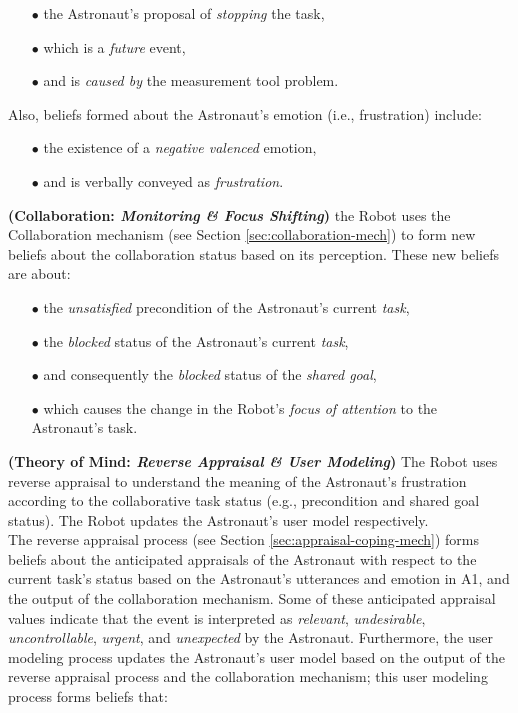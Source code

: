 \begin{itemize}
  \item[$\bullet$] the Astronaut's proposal of \textit{stopping} the task,
  \item[$\bullet$] which is a \textit{future} event,
  \item[$\bullet$] and is \textit{caused by} the measurement tool problem.
\end{itemize}

\noindent Also, beliefs formed about the Astronaut's emotion (i.e., frustration)
include:

\begin{itemize}
  \item[$\bullet$] the existence of a \textit{negative valenced} emotion,
  \item[$\bullet$] and is verbally conveyed as \textit{frustration}.\\
\end{itemize}

\noindent\textbf{(Collaboration: \textit{Monitoring \& Focus Shifting})}
the Robot uses the Collaboration mechanism (see Section
\ref{sec:collaboration-mech}) to form new beliefs about the collaboration status
based on its perception. These new beliefs are about:

\begin{itemize}
  \item[$\bullet$] the \textit{unsatisfied} precondition of the Astronaut's
  current \textit{task},
  \item[$\bullet$] the \textit{blocked} status of the Astronaut's current
  \textit{task},
  \item[$\bullet$] and consequently the \textit{blocked} status of the
  \textit{shared goal},
  \item[$\bullet$] which causes the change in the Robot's \textit{focus of
  attention} to the Astronaut's task.
\end{itemize}

\noindent \textbf{(Theory of Mind: \textit{Reverse Appraisal \& User
Modeling})} The Robot uses reverse appraisal to understand the meaning of the
Astronaut's frustration according to the collaborative task status (e.g.,
precondition and shared goal status). The Robot updates the Astronaut's user
model respectively.\\

The reverse appraisal process (see Section \ref{sec:appraisal-coping-mech})
forms beliefs about the anticipated appraisals of the Astronaut with respect to
the current task's status based on the Astronaut's utterances and emotion in A1,
and the output of the collaboration mechanism. Some of these anticipated
appraisal values indicate that the event is interpreted as \textit{relevant},
\textit{undesirable}, \textit{uncontrollable}, \textit{urgent}, and
\textit{unexpected} by the Astronaut. Furthermore, the user modeling process
updates the Astronaut's user model based on the output of the reverse appraisal
process and the collaboration mechanism; this user modeling process forms
beliefs that:

